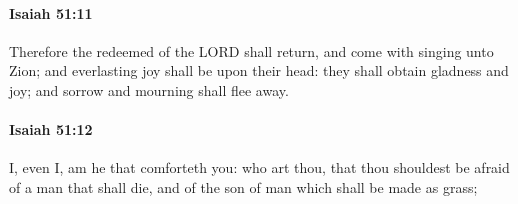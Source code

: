 		\paragraph{Isaiah 51:11} %
			\label{ISAIAH-51-11}

			Therefore the redeemed of the LORD shall return, and come with singing unto Zion; and everlasting joy shall be upon their head: they shall obtain gladness and joy; and sorrow and mourning shall flee away.


		\paragraph{Isaiah 51:12} %
			\label{ISAIAH-51-12}

			I, even I, am he that comforteth you: who art thou, that thou shouldest be afraid of a man that shall die, and of the son of man which shall be made as grass;


